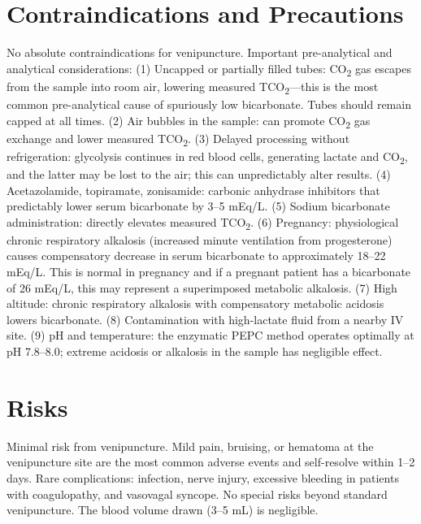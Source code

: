 \section*{Contraindications and Precautions}
No absolute contraindications for venipuncture. Important pre-analytical and analytical considerations: (1) Uncapped or partially filled tubes: CO\textsubscript{2} gas escapes from the sample into room air, lowering measured TCO\textsubscript{2}---this is the most common pre-analytical cause of spuriously low bicarbonate. Tubes should remain capped at all times. (2) Air bubbles in the sample: can promote CO\textsubscript{2} gas exchange and lower measured TCO\textsubscript{2}. (3) Delayed processing without refrigeration: glycolysis continues in red blood cells, generating lactate and CO\textsubscript{2}, and the latter may be lost to the air; this can unpredictably alter results. (4) Acetazolamide, topiramate, zonisamide: carbonic anhydrase inhibitors that predictably lower serum bicarbonate by 3--5 mEq/L. (5) Sodium bicarbonate administration: directly elevates measured TCO\textsubscript{2}. (6) Pregnancy: physiological chronic respiratory alkalosis (increased minute ventilation from progesterone) causes compensatory decrease in serum bicarbonate to approximately 18--22 mEq/L. This is normal in pregnancy and if a pregnant patient has a bicarbonate of 26 mEq/L, this may represent a superimposed metabolic alkalosis. (7) High altitude: chronic respiratory alkalosis with compensatory metabolic acidosis lowers bicarbonate. (8) Contamination with high-lactate fluid from a nearby IV site. (9) pH and temperature: the enzymatic PEPC method operates optimally at pH 7.8--8.0; extreme acidosis or alkalosis in the sample has negligible effect.

\section*{Risks}
Minimal risk from venipuncture. Mild pain, bruising, or hematoma at the venipuncture site are the most common adverse events and self-resolve within 1--2 days. Rare complications: infection, nerve injury, excessive bleeding in patients with coagulopathy, and vasovagal syncope. No special risks beyond standard venipuncture. The blood volume drawn (3--5 mL) is negligible.

